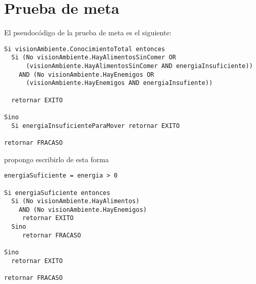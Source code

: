 \section{Prueba de meta}

El pseudocódigo de la prueba de meta es el siguiente:

\begin{verbatim}
Si visionAmbiente.ConocimientoTotal entonces
  Si (No visionAmbiente.HayAlimentosSinComer OR
      (visionAmbiente.HayAlimentosSinComer AND energiaInsuficiente))
    AND (No visionAmbiente.HayEnemigos OR
      (visionAmbiente.HayEnemigos AND energiaInsufiente))

  retornar EXITO

Sino
  Si energiaInsuficienteParaMover retornar EXITO

retornar FRACASO
\end{verbatim}
propongo escribirlo de esta forma
\begin{verbatim}
energiaSuficiente = energia > 0

Si energiaSuficiente entonces
  Si (No visionAmbiente.HayAlimentos)
    AND (No visionAmbiente.HayEnemigos)
     retornar EXITO
  Sino
     retornar FRACASO

Sino
  retornar EXITO

retornar FRACASO
\end{verbatim}

